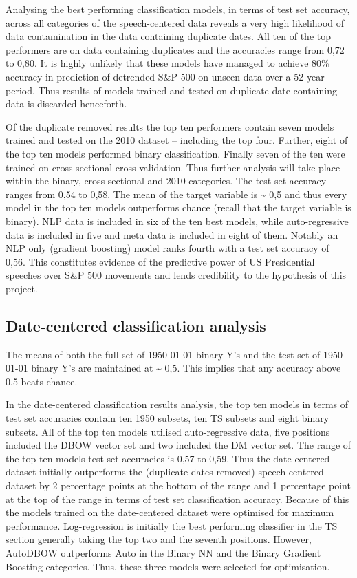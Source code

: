 \documentclass[11pt,preprint, authoryear]{elsarticle}
\numberwithin{equation}{section}
\numberwithin{figure}{section}
\numberwithin{table}{section}
\begin{document}
Analysing the best performing classification models, in terms of test
set accuracy, across all categories of the speech-centered data reveals
a very high likelihood of data contamination in the data containing
duplicate dates. All ten of the top performers are on data containing
duplicates and the accuracies range from 0,72 to 0,80. It is highly
unlikely that these models have managed to achieve 80\% accuracy in
prediction of detrended S\&P 500 on unseen data over a 52 year period.
Thus results of models trained and tested on duplicate date containing
data is discarded henceforth.

Of the duplicate removed results the top ten performers contain seven
models trained and tested on the 2010 dataset -- including the top four.
Further, eight of the top ten models performed binary classification.
Finally seven of the ten were trained on cross-sectional cross
validation. Thus further analysis will take place within the binary,
cross-sectional and 2010 categories. The test set accuracy ranges from
0,54 to 0,58. The mean of the target variable is \textasciitilde{} 0,5
and thus every model in the top ten models outperforms chance (recall
that the target variable is binary). NLP data is included in six of the
ten best models, while auto-regressive data is included in five and meta
data is included in eight of them. Notably an NLP only (gradient
boosting) model ranks fourth with a test set accuracy of 0,56. This
constitutes evidence of the predictive power of US Presidential speeches
over S\&P 500 movements and lends credibility to the hypothesis of this
project.

\hypertarget{date-centered-classification-analysis}{%
\subsection{Date-centered classification
analysis}\label{date-centered-classification-analysis}}

The means of both the full set of 1950-01-01 binary Y's and the test set
of 1950-01-01 binary Y's are maintained at \textasciitilde{} 0,5. This
implies that any accuracy above 0,5 beats chance.

In the date-centered classification results analysis, the top ten models
in terms of test set accuracies contain ten 1950 subsets, ten TS subsets
and eight binary subsets. All of the top ten models utilised
auto-regressive data, five positions included the DBOW vector set and
two included the DM vector set. The range of the top ten models test set
accuracies is 0,57 to 0,59. Thus the date-centered dataset initially
outperforms the (duplicate dates removed) speech-centered dataset by 2
percentage points at the bottom of the range and 1 percentage point at
the top of the range in terms of test set classification accuracy.
Because of this the models trained on the date-centered dataset were
optimised for maximum performance. Log-regression is initially the best
performing classifier in the TS section generally taking the top two and
the seventh positions. However, AutoDBOW outperforms Auto in the Binary
NN and the Binary Gradient Boosting categories. Thus, these three models
were selected for optimisation.
\end{document}
